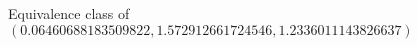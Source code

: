 \documentclass[preview]{standalone}
\begin{document}
\begin{center}
Equivalence class of $(0.06460688183509822, 1.572912661724546, 1.2336011143826637)$
\end{center}
\end{document}
